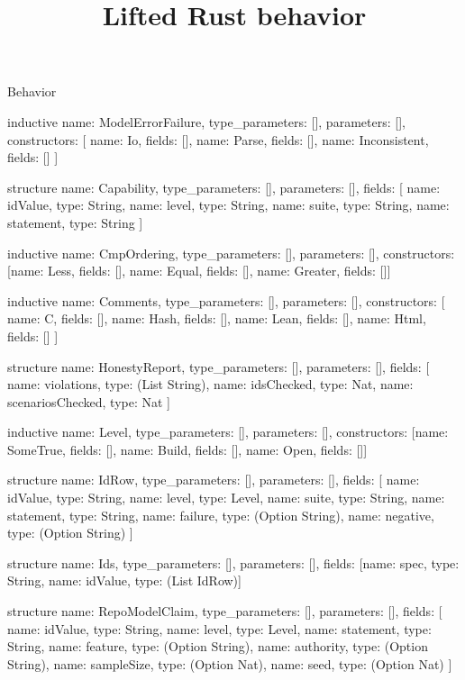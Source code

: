 \begin{lexlean}{Behavior}
\title{Lifted Rust behavior}
\begin{semanticmodule}
inductive{
  name: ModelErrorFailure,
  type_parameters: [],
  parameters: [],
  constructors: [
    {name: Io, fields: []},
    {name: Parse, fields: []},
    {name: Inconsistent, fields: []}
  ]
}

structure{
  name: Capability,
  type_parameters: [],
  parameters: [],
  fields: [
    {name: idValue, type: String},
    {name: level, type: String},
    {name: suite, type: String},
    {name: statement, type: String}
  ]
}

inductive{
  name: CmpOrdering,
  type_parameters: [],
  parameters: [],
  constructors: [{name: Less, fields: []}, {name: Equal, fields: []}, {name: Greater, fields: []}]
}

inductive{
  name: Comments,
  type_parameters: [],
  parameters: [],
  constructors: [
    {name: C, fields: []},
    {name: Hash, fields: []},
    {name: Lean, fields: []},
    {name: Html, fields: []}
  ]
}

structure{
  name: HonestyReport,
  type_parameters: [],
  parameters: [],
  fields: [
    {name: violations, type: (List String)},
    {name: idsChecked, type: Nat},
    {name: scenariosChecked, type: Nat}
  ]
}

inductive{
  name: Level,
  type_parameters: [],
  parameters: [],
  constructors: [{name: SomeTrue, fields: []}, {name: Build, fields: []}, {name: Open, fields: []}]
}

structure{
  name: IdRow,
  type_parameters: [],
  parameters: [],
  fields: [
    {name: idValue, type: String},
    {name: level, type: Level},
    {name: suite, type: String},
    {name: statement, type: String},
    {name: failure, type: (Option String)},
    {name: negative, type: (Option String)}
  ]
}

structure{
  name: Ids,
  type_parameters: [],
  parameters: [],
  fields: [{name: spec, type: String}, {name: idValue, type: (List IdRow)}]
}

structure{
  name: RepoModelClaim,
  type_parameters: [],
  parameters: [],
  fields: [
    {name: idValue, type: String},
    {name: level, type: Level},
    {name: statement, type: String},
    {name: feature, type: (Option String)},
    {name: authority, type: (Option String)},
    {name: sampleSize, type: (Option Nat)},
    {name: seed, type: (Option Nat)}
  ]
}


\end{semanticmodule}
\end{lexlean}
